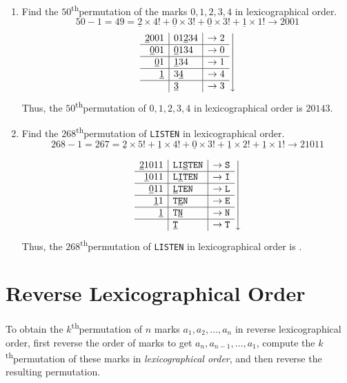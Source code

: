 \documentclass[svgnames]{article}
\renewcommand{\th}{\textsuperscript{th}}
\begin{document}
\begin{enumerate}
\item Find the $50$\th permutation of the marks $0, 1, 2, 3, 4$ in lexicographical order.
\begin{equation*}
50 - 1 = 49 = \underline 2 \times 4! + \underline 0 \times 3! + \underline 0 \times 3! + \underline 1 \times 1! \to 2001
\end{equation*}
\begin{equation*}
\left.
\begin{array}{r|l|c}
\underline 2001	&	01\underline 234	&	\to 2\\
\hline
\underline 001	&	\underline0134	&	\to 0\\
\hline
\underline 01	&	\underline134	&	\to 1\\
\hline
\underline 1	&	3\underline 4	&	\to 4\\
\hline
		&	\underline 3	&	\to 3
\end{array}
\right\downarrow
\end{equation*}
Thus, the $50$\th permutation of $0, 1, 2, 3, 4$ in lexicographical order is $\boxed{20143}$.

\item Find the $268$\th permutation of \texttt{LISTEN} in lexicographical order.
\begin{equation*}
268 - 1 = 267 = \underline 2 \times 5! + \underline 1 \times 4! + \underline 0 \times 3! + \underline 1 \times 2! + \underline 1 \times 1! \to 21011
\end{equation*}

\begin{equation*}
\left.
\begin{array}{r|l|c}
\underline 21011	&	\texttt{LI\underline STEN}	& \to \texttt{S}\\
\hline
\underline 1011	&	\texttt{L\underline ITEN}	&	\to \texttt{I}\\
\hline
\underline 011	&	\texttt{\underline LTEN}	&	\to \texttt{L}\\
\hline
\underline 11	&	\texttt{T\underline EN}	&	\to \texttt{E}\\
\hline
\underline 1	&	\texttt{T\underline N}	&	\to \texttt{N}\\
\hline
	&	\texttt{\underline T}	&	\to \texttt{T}
\end{array}
\right\downarrow
\end{equation*}
Thus, the $268$\th permutation of \texttt{LISTEN} in lexicographical order is .
\end{enumerate}

\section{Reverse Lexicographical Order}
To obtain the $k$\th permutation of $n$ marks $a_1, a_2, \ldots, a_n$ in reverse lexicographical order, first reverse the order of marks to get $a_n, a_{n-1}, \ldots, a_1$, compute the $k$\th permutation of these marks in \emph{lexicographical order}, and then reverse the resulting permutation.
\end{document}
